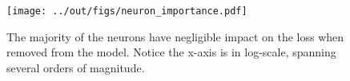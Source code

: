 \begin{figure}[t]
    \centering
    \texttt{[image: ../out/figs/neuron\_importance.pdf]}
    \caption{The majority of the neurons have negligible impact on the loss when removed from the model. Notice the x-axis is in log-scale, spanning several orders of magnitude. }
    \label{fig:neuron-importance}
\end{figure}